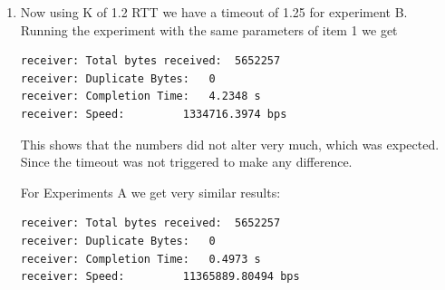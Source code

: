 \documentclass[paper=a4, fontsize=11pt]{scrartcl}
\numberwithin{equation}{section}		%
\numberwithin{figure}{section}			%
\numberwithin{table}{section}				%
\begin{document}
\begin{enumerate}
\begin{verbatim}
receiver: Total bytes received:	 6279947
receiver: Duplicate Bytes:	 628117
receiver: Completion Time:	 4.9360 s
receiver: Speed:		 1272266.3125 bps
\end{verbatim}

As expected, 10\% of the bytes received were duplicates, which means 10%
dropped.

And we also get a 11\% slowdown, which is roughly what would be expected
since 10\% of the packets were lost.

For experiment A we get:

\begin{verbatim}
receiver: Total bytes received:	 6279947
receiver: Duplicate Bytes:	 628117
receiver: Completion Time:	 1.6722 s
receiver: Speed:		 3755578.1973 bps
\end{verbatim}

\item Now using K of 1.2 RTT we have a timeout of 1.25 for experiment B.
  Running the experiment with the same parameters of item 1 we get

\begin{verbatim}
receiver: Total bytes received:	 5652257
receiver: Duplicate Bytes:	 0
receiver: Completion Time:	 4.2348 s
receiver: Speed:		 1334716.3974 bps
\end{verbatim}

This shows that the numbers did not alter very much, which was expected.
Since the timeout was not triggered to make any difference.

For Experiments A we get very similar results:

\begin{verbatim}
receiver: Total bytes received:	 5652257
receiver: Duplicate Bytes:	 0
receiver: Completion Time:	 0.4973 s
receiver: Speed:		 11365889.80494 bps
\end{verbatim}

\end{enumerate}


\end{document}
